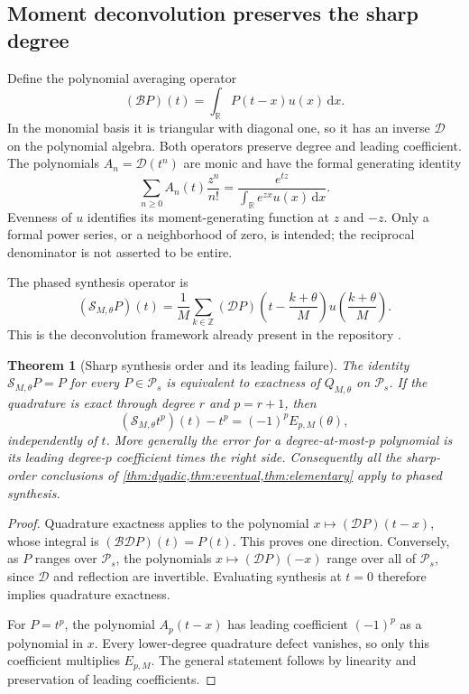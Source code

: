 \documentclass[11pt,a4paper]{article}
\numberwithin{equation}{section}
\theoremstyle{plain}
\newtheorem{theorem}{Theorem}[section]
\theoremstyle{definition}
\theoremstyle{remark}
\newcommand{\R}{\mathbb R}
\newcommand{\Z}{\mathbb Z}
\newcommand{\dd}{\,\mathrm d}
\newcommand{\Poly}{\mathcal P}
\begin{document}
\subsection{Moment deconvolution preserves the sharp degree}

Define the polynomial averaging operator
\begin{equation}\label{eq:B}
 (\mathcal BP)(t)=\int_\R P(t-x)u(x)\dd x.
\end{equation}
In the monomial basis it is triangular with diagonal one, so it has an
inverse $\mathcal D$ on the polynomial algebra. Both operators preserve
degree and leading coefficient. The polynomials $A_n=\mathcal D(t^n)$
are monic and have the formal generating identity
\[
 \sum_{n\ge0}A_n(t)\frac{z^n}{n!}
 =\frac{e^{tz}}{\int_\R e^{zx}u(x)\dd x}.
\]
Evenness of $u$ identifies its moment-generating function at $z$ and
$-z$. Only a formal power series, or a neighborhood of zero, is intended;
the reciprocal denominator is not asserted to be entire.

The phased synthesis operator is
\begin{equation}\label{eq:synthesis}
 (\mathcal S_{M,\theta}P)(t)
 =\frac1M\sum_{k\in\Z}
 (\mathcal DP)\!\left(t-\frac{k+\theta}{M}\right)
 u\!\left(\frac{k+\theta}{M}\right).
\end{equation}
This is the deconvolution framework already present in the repository
\cite{repo-lean,repo-phase}.

\begin{theorem}[Sharp synthesis order and its leading failure]
\label{thm:synthesis}
The identity $\mathcal S_{M,\theta}P=P$ for every $P\in\Poly_s$ is
equivalent to exactness of $Q_{M,\theta}$ on $\Poly_s$.
If the quadrature is exact through degree $r$ and $p=r+1$, then
\begin{equation}\label{eq:synthesis-error}
 (\mathcal S_{M,\theta}t^p)(t)-t^p=(-1)^pE_{p,M}(\theta),
\end{equation}
independently of $t$. More generally the error for a degree-at-most-$p$
polynomial is its leading degree-$p$ coefficient times the right side.
Consequently all the sharp-order conclusions of
\cref{thm:dyadic,thm:eventual,thm:elementary} apply to phased synthesis.
\end{theorem}
\begin{proof}
Quadrature exactness applies to the polynomial
$x\mapsto(\mathcal DP)(t-x)$, whose integral is
$(\mathcal B\mathcal DP)(t)=P(t)$. This proves one direction. Conversely,
as $P$ ranges over $\Poly_s$, the polynomials
$x\mapsto(\mathcal DP)(-x)$ range over all of $\Poly_s$, since
$\mathcal D$ and reflection are invertible. Evaluating synthesis at $t=0$
therefore implies quadrature exactness.

For $P=t^p$, the polynomial $A_p(t-x)$ has leading coefficient $(-1)^p$
as a polynomial in $x$. Every lower-degree quadrature defect vanishes,
so only this coefficient multiplies $E_{p,M}$. The general statement
follows by linearity and preservation of leading coefficients.
\end{proof}
\end{document}
